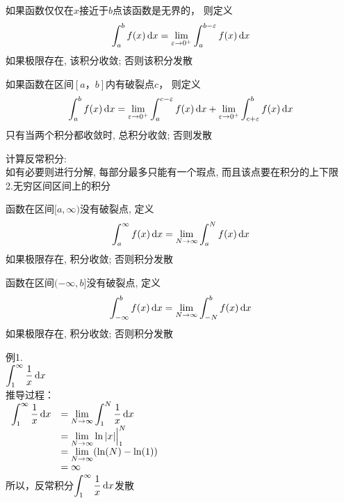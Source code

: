 \begin{center}
\begin{boxedminipage}{\textwidth}
如果函数仅仅在$x$接近于$b$点该函数是无界的， 则定义
\[\int_a^bf(x)\mathop{}\!\mathrm{d} x=\lim_{\varepsilon\to 0^+}\int_a^{b-\varepsilon}f(x)\mathop{}\!\mathrm{d} x\]
如果极限存在, 该积分收敛; 否则该积分发散
\end{boxedminipage}
\end{center}\vspace{2ex}

\begin{center}
\begin{boxedminipage}{\textwidth}
如果函数在区间$[a，b]$内有破裂点$c$， 则定义
\[\int_a^bf(x)\mathop{}\!\mathrm{d} x=\lim_{\varepsilon\to 0^+}\int_a^{c-\varepsilon}f(x)\mathop{}\!\mathrm{d} x+\lim_{\varepsilon\to 0^+}\int_{c+\varepsilon}^bf(x)\mathop{}\!\mathrm{d} x\]
只有当两个积分都收敛时, 总积分收敛; 否则发散
\end{boxedminipage}
\end{center}\vspace{2ex}

计算反常积分:\\
如有必要则进行分解, 每部分最多只能有一个瑕点, 而且该点要在积分的上下限\\[4ex]

2.无穷区间区间上的积分
\begin{center}
\begin{boxedminipage}{\textwidth}
函数在区间$[a, \infty)$没有破裂点, 定义
\[\int_a^\infty f(x)\mathop{}\!\mathrm{d} x=\lim_{N\to\infty}\int_a^N f(x)\mathop{}\!\mathrm{d} x\]
如果极限存在, 积分收敛; 否则积分发散
\end{boxedminipage}
\end{center}\vspace{2ex}

\begin{center}
\begin{boxedminipage}{\textwidth}
函数在区间$(-\infty, b]$没有破裂点, 定义
\[\int_{-\infty}^b f(x)\mathop{}\!\mathrm{d} x=\lim_{N\to\infty}\int_{-N}^b f(x)\mathop{}\!\mathrm{d} x\]
如果极限存在, 积分收敛; 否则积分发散
\end{boxedminipage}
\end{center}\vspace{4ex}

例1.\\
\phantom{例}$\displaystyle\int_1^{\infty}\frac{1}{x}\mathop{}\!\mathrm{d} x$\\
推导过程：\\
$\begin{array}{>{\displaystyle}r >{\displaystyle}l}
\int_1^{\infty}\frac{1}{x}\dif x & =\lim_{N\to\infty}\int_1^N\frac{1}{x}\dif x\\
& =\lim_{N\to\infty}\ln|x|\Big|_1^N\\
& =\lim_{N\to\infty}(\ln(N)-\ln(1))\\
& =\infty
\end{array}$\\
所以，反常积分$\displaystyle\int_1^{\infty}\frac{1}{x}\mathop{}\!\mathrm{d} x$发散\\

